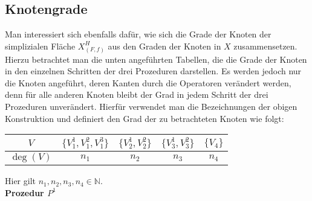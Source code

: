\documentclass[12pt,titlepage,twoside,cleardoublepage]{article}
\theoremstyle{nummermitklammern}
\numberwithin{equation}{section}
\begin{document}
\subsection{Knotengrade}\label{kg}
Man interessiert sich ebenfalls dafür, wie sich die Grade der Knoten der simplizialen Fläche $X^H_{(F,f)}$ aus den Graden der Knoten in $X$ zusammensetzen. Hierzu betrachtet man die unten angeführten Tabellen, die die Grade der Knoten in den einzelnen Schritten der drei Prozeduren darstellen. Es werden jedoch nur die Knoten angeführt, deren Kanten durch die Operatoren verändert werden, denn für alle anderen Knoten bleibt der Grad in jedem Schritt der drei Prozeduren unverändert. Hierfür verwendet man die Bezeichnungen der obigen Konstruktion und definiert den Grad der zu betrachteten Knoten wie folgt:
\begin{center}
\begin{tabular}{|c|c|c|c|c|}
\hline
  \textbf{$V$} & $\{V_1^1,V_1^2,V_1^3\}$ & $\{V_2^1,V_2^2\}$& $\{V_3^1,V_3^2\}$& $\{V_4\}$\\ 
  \hline
   \textbf{$\deg(V)$} & $n_1$ & $n_2$ & $n_3$ & $n_4$ \\  
   \hline
 \end{tabular}
 \end{center}
  Hier gilt $n_1,n_2,n_3,n_4 \in \mathbb{N}$.\\
 \textbf{Prozedur $P^1$}
\end{document}
